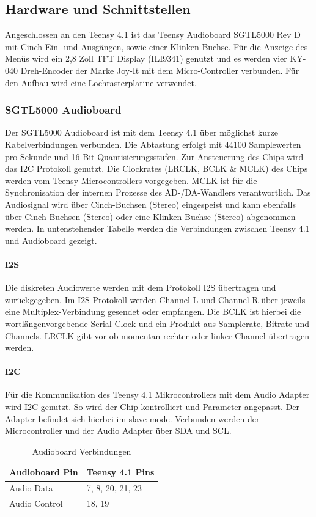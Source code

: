 \documentclass[12pt]{article}
\begin{document}
\subsection{Hardware und Schnittstellen}
Angeschlossen an den Teensy 4.1 ist das Teensy Audioboard SGTL5000 Rev D mit Cinch Ein- und Ausgängen, sowie einer Klinken-Buchse. 
Für die Anzeige des Menüs wird ein 2,8 Zoll TFT Display (ILI9341) 
genutzt und es werden vier KY-040 Dreh-Encoder der Marke Joy-It mit dem Micro-Controller verbunden. 
Für den Aufbau wird eine Lochrasterplatine verwendet. 

\subsubsection{SGTL5000 Audioboard}
Der SGTL5000 Audioboard ist mit dem Teensy 4.1 über möglichst kurze Kabelverbindungen verbunden. 
Die Abtastung erfolgt mit 44100 Samplewerten pro Sekunde und 16 Bit Quantisierungsstufen. 
Zur Ansteuerung des Chips wird das I2C Protokoll genutzt. 
Die Clockrates (LRCLK, BCLK \& MCLK) des Chips werden vom Teensy Microcontrollers vorgegeben. 
MCLK ist für die Synchronisation der internen Prozesse des AD-/DA-Wandlers verantwortlich.
Das Audiosignal wird über Cinch-Buchsen (Stereo) eingespeist und kann 
ebenfalls über Cinch-Buchsen (Stereo) oder eine Klinken-Buchse (Stereo) abgenommen werden.
In untenstehender Tabelle werden die Verbindungen zwischen Teensy 4.1 und Audioboard gezeigt.  
\paragraph{I2S}
Die diskreten Audiowerte werden mit dem Protokoll I2S übertragen und zurückgegeben. 
Im I2S Protokoll werden Channel L und Channel R über jeweils eine Multiplex-Verbindung gesendet oder empfangen. 
Die BCLK ist hierbei die wortlängenvorgebende Serial Clock und ein Produkt aus Samplerate, Bitrate und Channels. 
LRCLK gibt vor ob momentan rechter oder linker Channel übertragen werden. 
\paragraph{I2C}
Für die Kommunikation des Teensy 4.1 Mikrocontrollers mit dem Audio Adapter wird I2C genutzt. So wird der Chip kontrolliert und Parameter angepasst. 
Der Adapter befindet sich hierbei im \glq slave mode\grq{}. Verbunden werden der Microcontroller und der Audio Adapter über SDA und SCL. 

\begin{table}[h]
  \centering
  \caption{Audioboard Verbindungen}
  \label{tbl:audioboardverbindungen}
  \begin{tabular}{l|l}
    \textbf{Audioboard Pin}  & \textbf{Teensy 4.1 Pins}\\
    \hline
    Audio Data & 7, 8, 20, 21, 23\\
 
    Audio Control	 & 18, 19\\
 
   

  \end{tabular}    

\end{table}
\end{document}
